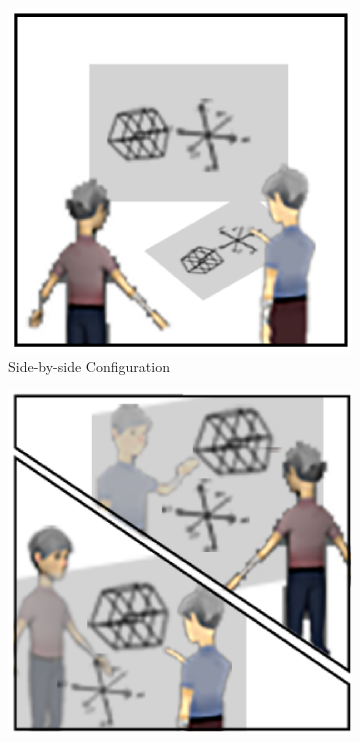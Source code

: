 \documentclass[chi_draft]{sigchi}
\begin{document}
  
\begin{figure}
\centering
    \begin{subfigure}[b]{0.6\columnwidth}
        \includegraphics[width=1\columnwidth]{teaser1.png}
        \caption{Side-by-side Configuration}
    \end{subfigure}
    \begin{subfigure}[b]{0.6\columnwidth}
        \includegraphics[width=1\columnwidth]{teaser2.png}

\end{subfigure}
\end{figure}
\end{document}
